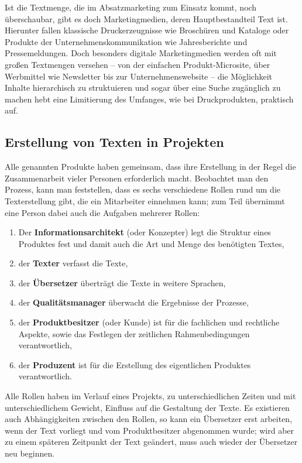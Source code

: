 \documentclass[11pt,a4paper]{article}
\begin{document}
Ist die Textmenge, die im Absatzmarketing zum Einsatz kommt, noch überschaubar, gibt es doch Marketingmedien, deren Hauptbestandteil Text ist. Hierunter fallen klassische Druckerzeugnisse wie Broschüren und Kataloge oder Produkte der Unternehmenskommunikation wie Jahresberichte und Pressemeldungen. Doch besonders digitale Marketingmedien werden oft mit großen Textmengen versehen – von der einfachen Produkt-Microsite, über Werbmittel wie Newsletter bis zur Unternehmenswebsite – die Möglichkeit Inhalte hierarchisch zu struktuieren und sogar über eine Suche zugänglich zu machen hebt eine Limitierung des Umfanges, wie bei Druckprodukten, praktisch auf.

\subsection{Erstellung von Texten in Projekten}

Alle genannten Produkte haben gemeinsam, dass ihre Erstellung in der Regel die Zusammenarbeit vieler Personen erforderlich macht. Beobachtet man den Prozess, kann man feststellen, dass es sechs verschiedene Rollen rund um die Texterstellung gibt, die ein Mitarbeiter einnehmen kann; zum Teil übernimmt eine Person dabei auch die Aufgaben mehrerer Rollen:

\begin{enumerate}
\item{Der \textbf{Informationsarchitekt} (oder Konzepter) legt die Struktur eines Produktes fest und damit auch die Art und Menge des benötigten Textes,}
\item{der \textbf{Texter} verfasst die Texte,}
\item{der \textbf{Übersetzer} überträgt die Texte in weitere Sprachen,}
\item{der \textbf{Qualitätsmanager} überwacht die Ergebnisse der Prozesse,}
\item{der \textbf{Produktbesitzer} (oder Kunde) ist für die fachlichen und rechtliche Aspekte, sowie das Festlegen der zeitlichen Rahmenbedingungen verantwortlich,}
\item{der \textbf{Produzent} ist für die Erstellung des eigentlichen Produktes verantwortlich.}
\end{enumerate}

Alle Rollen haben im Verlauf eines Projekts, zu unterschiedlichen Zeiten und mit unterschiedlichem Gewicht, Einfluss auf die Gestaltung der Texte. Es existieren auch Abhängigkeiten zwischen den Rollen, so kann ein Übersetzer erst arbeiten, wenn der Text vorliegt und vom Produktbesitzer abgenommen wurde; wird aber zu einem späteren Zeitpunkt der Text geändert, muss auch wieder der Übersetzer neu beginnen.
\end{document}
